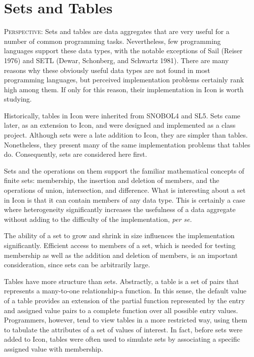 \chapter{Sets and Tables}

\textsc{Perspective}: Sets and tables are data aggregates that are
very useful for a number of common programming tasks.  Nevertheless,
few programming languages support these data types, with the notable
exceptions of Sail (Reiser 1976) and SETL (Dewar, Schonberg, and
Schwartz 1981). There are many reasons why these obviously useful data
types are not found in most programming languages, but perceived
implementation problems certainly rank high among them. If only for
this reason, their implementation in Icon is worth studying.

Historically, tables in Icon were inherited from SNOBOL4 and SL5. Sets
came later, as an extension to Icon, and were designed and implemented
as a class project. Although sets were a late addition to Icon, they
are simpler than tables.  Nonetheless, they present many of the same
implementation problems that tables do. Consequently, sets are
considered here first.

Sets and the operations on them support the familiar mathematical
concepts of finite sets: membership, the insertion and deletion of
members, and the operations of union, intersection, and
difference. What is interesting about a set in Icon is that it can
contain members of any data type. This is certainly a case where
heterogeneity significantly increases the usefulness of a data
aggregate without adding to the difficulty of the implementation,
\textit{per se.}

The ability of a set to grow and shrink in size influences the
implementation significantly. Efficient access to members of a set,
which is needed for testing membership as well as the addition and
deletion of members, is an important consideration, since sets can be
arbitrarily large.


Tables have more structure than sets. Abstractly, a table is a set of
pairs that represents a many-to-one relationship-a function. In this
sense, the default value of a table provides an extension of the
partial function represented by the entry and assigned value pairs to
a complete function over all possible entry values. Programmers,
however, tend to view tables in a more restricted way, using them to
tabulate the attributes of a set of values of interest. In fact,
before sets were added to Icon, tables were often used to simulate
sets by associating a specific assigned value with membership.

